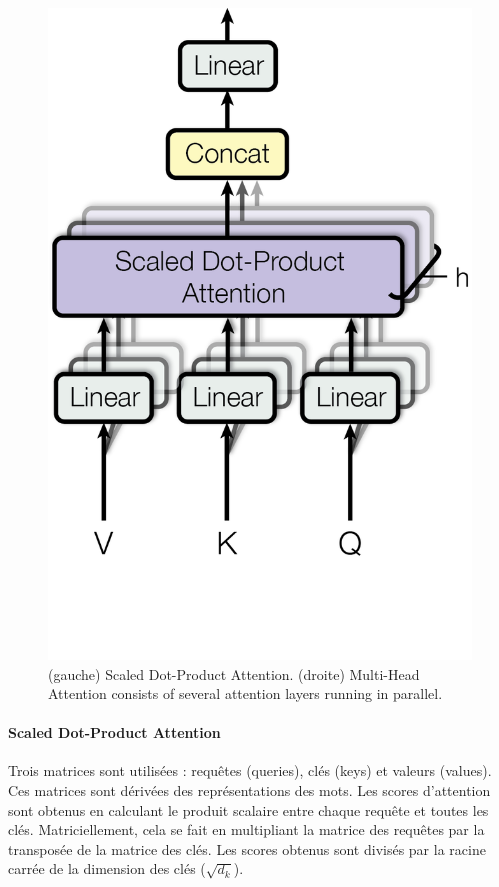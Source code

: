 \begin{figure}
\begin{minipage}[t]{0.5\textwidth}
      \includegraphics[scale=0.7]{gfx/ModalNet-20}  
    \end{minipage}
    
    \caption{(gauche) Scaled Dot-Product Attention. (droite) Multi-Head Attention consists of several attention layers running in parallel. \cite{vaswani2023attention}}
    \label{fig:multi-head-att}
\end{figure}

\paragraph{Scaled Dot-Product Attention} \hspace{0pt}

Trois matrices sont utilisées : requêtes (queries), clés (keys) et valeurs (values). Ces matrices sont dérivées des représentations des mots. Les scores d'attention sont obtenus en calculant le produit scalaire entre chaque requête et toutes les clés. Matriciellement, cela se fait en multipliant la matrice des requêtes par la transposée de la matrice des clés. Les scores obtenus sont divisés par la racine carrée de la dimension des clés ($\sqrt{d_k}$).

